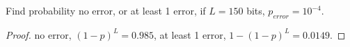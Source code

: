 \documentclass[./answersheet.tex]{subfiles}
\begin{document}
\begin{wts}
    Find probability no error, or at least 1 error, if $L=150$ bits, $p_{error}=10^{-4}$.
\end{wts}
\begin{proof}
    no error, $(1-p)^L=0.985$, at least 1 error, $1- (1-p)^L=0.0149$.
\end{proof}
\end{document}
